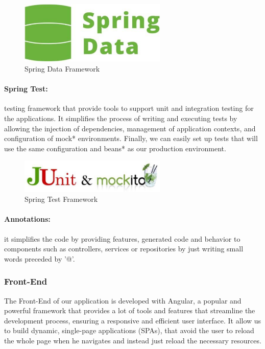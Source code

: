 \documentclass[12pt,a4paper,table,english]{article}
\begin{document}
	\begin{figure}[H]
	\centering
	\includegraphics[width=70mm]{Image/springdata}
	\caption{Spring Data Framework}
	\label{fig:Spring Data Framework}
	\end{figure}
	
	\paragraph{Spring Test:} testing framework that provide tools to support unit and integration testing for the applications. It simplifies the process of writing and executing tests by allowing the injection of dependencies, management of application contexts, and configuration of mock* environments. Finally, we can easily set up tests that will use the same configuration and beans* as our production environment.
	
		
	\begin{figure}[H]
		\centering
		\includegraphics[width=70mm]{Image/springtest}
		\caption{Spring Test Framework}
		\label{fig:Spring Test Framework}
	\end{figure}

	\paragraph{Annotations:} it simplifies the code by providing features, generated code and behavior to components such as controllers, services or repositories by just writing small words preceded by '@'.
	
	
	\subsubsection{Front-End}

	The Front-End of our application is developed with Angular, a popular and powerful framework that provides a lot of tools and features that streamline the development process, ensuring a responsive and efficient user interface. It allow us to build dynamic, single-page applications (SPAs), that avoid the user to reload the whole page when he navigates and instead just reload the necessary resources.
	
\end{document}
